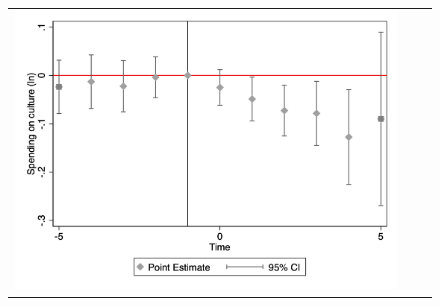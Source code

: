 \begin{figure}[ht]
\begin{tabular}{@{}ccc@{}}
\begin{minipage}[t]{0.32\textwidth}
            \includegraphics[width=\linewidth]{images/total population/caseventdd_ln_q4_05_step1.jpg}
            \label{fig:casculture}
        \end{minipage} \\[10pt]


\end{tabular}
\end{figure}
